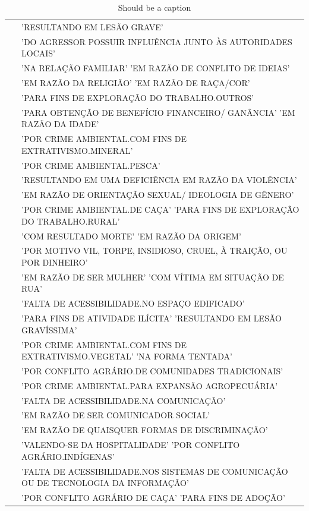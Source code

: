 \documentclass[12pt]{report}
\begin{document}
\begin {table}[ht]
\begin{tabular}{|l|l|}
		~ & 'RESULTANDO EM LESÃO GRAVE'\\
		~ & 'DO AGRESSOR POSSUIR INFLUÊNCIA JUNTO ÀS AUTORIDADES LOCAIS'\\
		~ & 'NA RELAÇÃO FAMILIAR' 'EM RAZÃO DE CONFLITO DE IDEIAS'\\
		~ & 'EM RAZÃO DA RELIGIÃO' 'EM RAZÃO DE RAÇA/COR'\\
		~ & 'PARA FINS DE EXPLORAÇÃO DO TRABALHO.OUTROS'\\
		~ & 'PARA OBTENÇÃO DE BENEFÍCIO FINANCEIRO/ GANÂNCIA' 'EM RAZÃO DA IDADE'\\
		~ & 'POR CRIME AMBIENTAL.COM FINS DE EXTRATIVISMO.MINERAL'\\
		~ & 'POR CRIME AMBIENTAL.PESCA'\\
		~ & 'RESULTANDO EM UMA DEFICIÊNCIA EM RAZÃO DA VIOLÊNCIA'\\
		~ & 'EM RAZÃO DE ORIENTAÇÃO SEXUAL/ IDEOLOGIA DE GÊNERO'\\
		~ & 'POR CRIME AMBIENTAL.DE CAÇA' 'PARA FINS DE EXPLORAÇÃO DO TRABALHO.RURAL'\\
		~ & 'COM RESULTADO MORTE' 'EM RAZÃO DA ORIGEM'\\
		~ & 'POR MOTIVO VIL, TORPE, INSIDIOSO, CRUEL, À TRAIÇÃO, OU POR DINHEIRO'\\
		~ & 'EM RAZÃO DE SER MULHER' 'COM VÍTIMA EM SITUAÇÃO DE RUA'\\
		~ & 'FALTA DE ACESSIBILIDADE.NO ESPAÇO EDIFICADO'\\
		~ & 'PARA FINS DE ATIVIDADE ILÍCITA' 'RESULTANDO EM LESÃO GRAVÍSSIMA'\\
		~ & 'POR CRIME AMBIENTAL.COM FINS DE EXTRATIVISMO.VEGETAL' 'NA FORMA TENTADA'\\
		~ & 'POR CONFLITO AGRÁRIO.DE COMUNIDADES TRADICIONAIS'\\
		~ & 'POR CRIME AMBIENTAL.PARA EXPANSÃO AGROPECUÁRIA'\\
		~ & 'FALTA DE ACESSIBILIDADE.NA COMUNICAÇÃO'\\
		~ & 'EM RAZÃO DE SER COMUNICADOR SOCIAL'\\
		~ & 'EM RAZÃO DE QUAISQUER FORMAS DE DISCRIMINAÇÃO'\\
		~ & 'VALENDO-SE DA HOSPITALIDADE' 'POR CONFLITO AGRÁRIO.INDÍGENAS'\\
		~ & 'FALTA DE ACESSIBILIDADE.NOS SISTEMAS DE COMUNICAÇÃO OU DE TECNOLOGIA DA INFORMAÇÃO'\\
		~ & 'POR CONFLITO AGRÁRIO DE CAÇA' 'PARA FINS DE ADOÇÃO'\\
		\hline
	\end{tabular}
	\caption {Should be a caption}

	\end {table}
\end{document}
